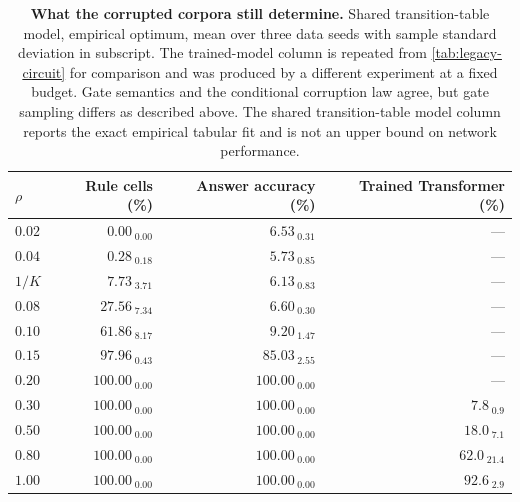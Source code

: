 \begin{table}[t]
\centering
\small
\begin{tabular}{lrrr}
\toprule
$\rho$ & Rule cells (\%) & Answer accuracy (\%) & Trained Transformer (\%)\\
\midrule
$0.02$  & $0.00_{\;\text{0.00}}$   & $6.53_{\;\text{0.31}}$   & ---\\
$0.04$  & $0.28_{\;\text{0.18}}$   & $5.73_{\;\text{0.85}}$   & ---\\
$1/K$   & $7.73_{\;\text{3.71}}$   & $6.13_{\;\text{0.83}}$   & ---\\
$0.08$  & $27.56_{\;\text{7.34}}$  & $6.60_{\;\text{0.30}}$   & ---\\
$0.10$  & $61.86_{\;\text{8.17}}$  & $9.20_{\;\text{1.47}}$   & ---\\
$0.15$  & $97.96_{\;\text{0.43}}$  & $85.03_{\;\text{2.55}}$  & ---\\
$0.20$  & $100.00_{\;\text{0.00}}$ & $100.00_{\;\text{0.00}}$ & ---\\
$0.30$  & $100.00_{\;\text{0.00}}$ & $100.00_{\;\text{0.00}}$ & $7.8_{\;\text{0.9}}$\\
$0.50$  & $100.00_{\;\text{0.00}}$ & $100.00_{\;\text{0.00}}$ & $18.0_{\;\text{7.1}}$\\
$0.80$  & $100.00_{\;\text{0.00}}$ & $100.00_{\;\text{0.00}}$ & $62.0_{\;\text{21.4}}$\\
$1.00$  & $100.00_{\;\text{0.00}}$ & $100.00_{\;\text{0.00}}$ & $92.6_{\;\text{2.9}}$\\
\bottomrule
\end{tabular}
\caption{\textbf{What the corrupted corpora still determine.}  Shared
transition-table model, empirical optimum, mean over three data seeds with
sample standard deviation in subscript.  The trained-model column is
repeated from \cref{tab:legacy-circuit} for comparison and was produced by
a different experiment at a fixed budget. Gate semantics and the
conditional corruption law agree, but gate sampling differs as described
above. The shared transition-table model column reports the exact
empirical tabular fit and is not an upper bound on network performance.}
\label{tab:noise-recovery}
\end{table}

